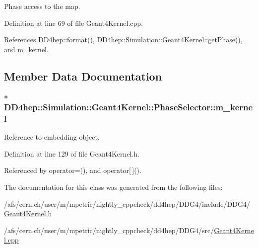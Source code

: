 Phase access to the map. 

Definition at line 69 of file Geant4Kernel.cpp.

References DD4hep::format(), DD4hep::Simulation::Geant4Kernel::getPhase(), and m\_\-kernel.

\subsection{Member Data Documentation}
\hypertarget{class_d_d4hep_1_1_simulation_1_1_geant4_kernel_1_1_phase_selector_a8f91fcbd0cf2877738f2e227a697d88c}{
\subsubsection[{m\_\-kernel}]{$\ast$ {\bf DD4hep::Simulation::Geant4Kernel::PhaseSelector::m\_\-kernel}}}
\label{class_d_d4hep_1_1_simulation_1_1_geant4_kernel_1_1_phase_selector_a8f91fcbd0cf2877738f2e227a697d88c}


Reference to embedding object. 

Definition at line 129 of file Geant4Kernel.h.

Referenced by operator=(), and operator\mbox{[}$\,$\mbox{]}().

The documentation for this class was generated from the following files:\begin{DoxyCompactItemize}
\item 
/afs/cern.ch/user/m/mpetric/nightly\_\-cppcheck/dd4hep/DDG4/include/DDG4/\hyperlink{_geant4_kernel_8h}{Geant4Kernel.h}\item 
/afs/cern.ch/user/m/mpetric/nightly\_\-cppcheck/dd4hep/DDG4/src/\hyperlink{_geant4_kernel_8cpp}{Geant4Kernel.cpp}\end{DoxyCompactItemize}
